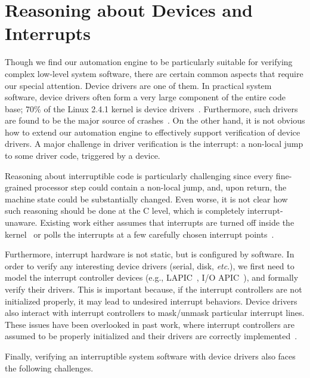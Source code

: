 \section{Reasoning about Devices and Interrupts}

Though we find our automation engine to be particularly suitable for verifying
complex low-level system software, there are certain common aspects that
require our special attention. Device drivers are one of them.
In practical system software, device drivers often form a very large component
of the entire code base; 70\% of the Linux 2.4.1 kernel is
device drivers~\cite{Chou:2001}.
Furthermore, such drivers are found
to be the major source of crashes~\cite{Chou:2001,Ball:2006,Ganapathi:2006}.
On the other hand, it is not obvious how to extend our automation engine
to effectively support verification of device drivers.
A major challenge in driver verification is the interrupt: a non-local
jump to some driver code, triggered by a device. 
Reasoning about interruptible code is
particularly challenging since every fine-grained processor step
could contain a non-local jump, and, upon return, the machine state
could be substantially changed. Even worse, it is not clear how such
reasoning should be done at the C level, which is completely
interrupt-unaware. Existing work either assumes that interrupts are
turned off inside the kernel~\cite{dscal15,verisoft07} or polls the
interrupts at a few carefully chosen interrupt points~\cite{klein14}.

Furthermore, interrupt hardware is not static, but is configured by
software. In order to verify any interesting device drivers (serial,
disk, {\it etc}.), we first need to model the interrupt controller
devices (e.g., LAPIC~\cite{mps97}, I/O APIC~\cite{ioapicd96}), and
formally verify their drivers. This is important because, if the
interrupt controllers are not initialized properly, it may lead to
undesired interrupt behaviors. Device drivers also interact with
interrupt controllers to mask/unmask particular interrupt lines.
These issues have been overlooked in past work, where 
interrupt controllers are assumed to be properly initialized and
their drivers are correctly implemented~\cite{Alkassar:VSTTE08-225}.

Finally, verifying an interruptible system software with device
drivers also faces the following challenges.

